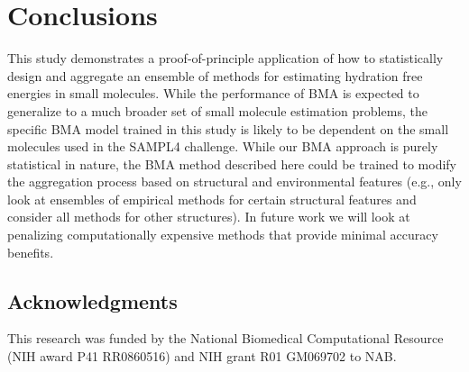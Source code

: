 \documentclass[12pt]{article}
\newcommand{\+}[1]{\ensuremath{\mathbf{#1}}}
\begin{document}
\section{Conclusions}
This study demonstrates a proof-of-principle application of how to statistically design and aggregate an ensemble of methods for estimating hydration free energies in small molecules.  While the performance of BMA is expected to generalize to a much broader set of small molecule estimation problems, the specific BMA model trained in this study is likely to be dependent on the small molecules used in the SAMPL4 challenge.  While our BMA approach is purely statistical in nature, the BMA method described here could be trained to modify the aggregation process based on structural and environmental features (e.g., only look at ensembles of empirical methods for certain structural features and consider all methods for other structures). In future work we will look at penalizing computationally expensive methods that provide minimal accuracy benefits. 


\subsection*{Acknowledgments}
This research was funded by the National Biomedical Computational Resource (NIH award P41 RR0860516) and NIH grant R01 GM069702 to NAB.

\footnotesize


\clearpage
\end{document}
